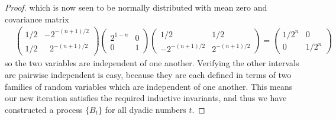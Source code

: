 \begin{proof}
    which is now seen to be normally distributed with mean zero and covariance matrix
    \begin{align*}
        & \begin{pmatrix} 1/2 & -2^{-(n+1)/2} \\ 1/2 &\ \ \ 2^{-(n+1)/2} \end{pmatrix} \begin{pmatrix} 2^{1-n} & 0 \\ 0 & 1 \end{pmatrix} \begin{pmatrix} 1/2 & 1/2 \\ -2^{-(n+1)/2} & 2^{-(n+1)/2} \end{pmatrix} = \begin{pmatrix} 1/2^n & 0 \\ 0 & 1/2^n \end{pmatrix}
    \end{align*}
    so the two variables are independent of one another. Verifying the other intervals are pairwise independent is easy, because they are each defined in terms of two families of random variables which are independent of one another. This means our new iteration satisfies the required inductive invariants, and thus we have constructed a process $\{ B_t \}$ for all dyadic numbers $t$.


\end{proof}
